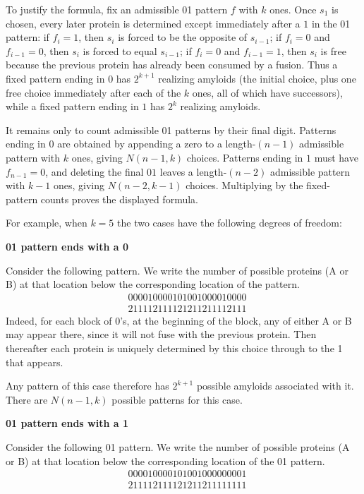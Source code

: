 \documentclass[referee,lineno,pdflatex,sn-mathphys-ay]{sn-jnl}
\begin{document}
To justify the formula, fix an admissible 01 pattern $f$ with $k$ ones. Once $s_1$ is chosen, every later protein is determined except immediately after a $1$ in the 01 pattern: if $f_i=1$, then $s_i$ is forced to be the opposite of $s_{i-1}$; if $f_i=0$ and $f_{i-1}=0$, then $s_i$ is forced to equal $s_{i-1}$; if $f_i=0$ and $f_{i-1}=1$, then $s_i$ is free because the previous protein has already been consumed by a fusion. Thus a fixed pattern ending in $0$ has $2^{k+1}$ realizing amyloids (the initial choice, plus one free choice immediately after each of the $k$ ones, all of which have successors), while a fixed pattern ending in $1$ has $2^k$ realizing amyloids.

It remains only to count admissible 01 patterns by their final digit. Patterns ending in $0$ are obtained by appending a zero to a length-$(n-1)$ admissible pattern with $k$ ones, giving $N(n-1,k)$ choices. Patterns ending in $1$ must have $f_{n-1}=0$, and deleting the final $01$ leaves a length-$(n-2)$ admissible pattern with $k-1$ ones, giving $N(n-2,k-1)$ choices. Multiplying by the fixed-pattern counts proves the displayed formula.

For example, when $k = 5$ the two cases have the following degrees of freedom:

\textbf{01 pattern ends with a 0}

Consider the following pattern. We write the number of possible proteins (A or B) at that location below the corresponding location of the pattern.
\begin{align*} 
    & 000010000101001000010000 \\
    & 211112111121211211112111
\end{align*}
Indeed, for each block of 0's, at the beginning of the block, any of either A or B may appear there, since it will not fuse with the previous protein. Then thereafter each protein is uniquely determined by this choice through to the 1 that appears.

Any pattern of this case therefore has $2^{k+1}$ possible amyloids associated with it. There are $N(n-1,k)$ possible patterns for this case. 

\textbf{01 pattern ends with a 1}

Consider the following 01 pattern. We write the number of possible proteins (A or B) at that location below the corresponding location of the 01 pattern.
\begin{align*} 
    & 000010000101001000000001 \\
    & 211112111121211211111111
\end{align*}
\end{document}
